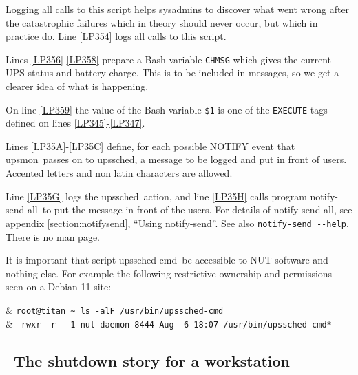 \documentclass[12pt]{article}
\newlength{\headersep}\setlength{\headersep}{3mm}
\newcommand{\Hsep}{\hspace{\headersep}}
\newcommand{\upsmon}{\mbox{\textcolor{MONCOLOUR}{upsmon}}}
\newcommand{\upssched}{\mbox{\textcolor{SCHEDCOLOUR}{upssched}}}
\newcommand{\upsschedcmd}{\mbox{\textcolor{CMDCOLOUR}{upssched-cmd}}}
\newcommand{\notifysend}{\mbox{\textcolor{NOTIFYCOLOUR}{notify-send}}}
\newcommand{\notifysendall}{\mbox{\textcolor{NOTIFYCOLOUR}{notify-send-all}}}
\begin{document}
Logging all calls to this script helps sysadmins to discover what went wrong
after the catastrophic failures which in theory should never occur, but which
in practice do.  Line \ref{LP354} logs all calls to this script.

Lines \ref{LP356}-\ref{LP358} prepare a Bash variable \texttt{CHMSG} which
gives the current UPS status and battery charge.  This is to be included in
messages, so we get a clearer idea of what is happening.

On line \ref{LP359} the value of the Bash variable \texttt{\$1} is one of the
\texttt{EXECUTE} tags defined on lines \ref{LP345}-\ref{LP347}.

Lines \ref{LP35A}-\ref{LP35C} define, for each possible NOTIFY event that
\upsmon\ passes on to \upssched, a message to be logged and put in front of
users.  Accented letters and non latin characters are allowed.

Line \ref{LP35G} logs the \upssched\ action, and line \ref{LP35H} calls
program \notifysendall\ to put the message in front of the users.  For details
of \notifysendall, see appendix \ref{section:notifysend}, ``Using \notifysend''.
See also \texttt{notify-send -\/-help}.  There is no man page.

It is important that script \upsschedcmd\ be accessible to NUT
software and nothing else.  For example the following restrictive
ownership and permissions seen on a Debian 11 site:

\begin{LinePrinter}[0.95\LinePrinterwidth]
\Clunk  & \verb`root@titan ~ ls -alF /usr/bin/upssched-cmd` \\
\Clunk  & \verb`-rwxr--r-- 1 nut daemon 8444 Aug  6 18:07 /usr/bin/upssched-cmd*` \\
\end{LinePrinter}

\vspace*{\fill}

\begin{center}
\end{center}

\vspace*{\fill}


\subsection{\Hsep\ The shutdown story for a workstation}\label{section:story:workstation}
\end{document}
